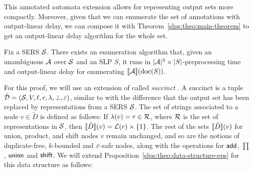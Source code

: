 This annotated automata extension allows for representing output sets more compactly. Moreover, given that we can enumerate the set of annotations with output-linear delay, we can compose it with Theorem~\ref{slps:theo:main-theorem} to get an output-linear delay algorithm for the whole set.  

\begin{theorem}\label{slps:theo-algo-succ}
	Fix a SERS $\mathcal{S}$. There exists an enumeration algorithm that, given an unambiguous \crt $\mathcal{A}$ over $\mathcal{S}$ and an SLP $S$, it runs in $|\mathcal{A}|^3 \times |S|$-preprocessing time and output-linear delay for enumerating $\llbracket \mathcal{A} \rrbracket(\operatorname{doc}(S))$. 
\end{theorem}
	For this proof, we will use an extension of \dsabbrs called {\it succinct \dsabbrs}.
	A succinct \dsabbrs is a tuple $\tilde{\mathcal{D}} = (\mathcal{S}, V, \ell, r, \lambda, \bot, \varepsilon)$, similar to \dsabbr with the difference that the output set has been replaced by representations from a SERS $\mathcal{S}$. The set of strings associated to a node $v\in \tilde{D}$ is defined as follows: 
	If $\lambda(v) = r\in \mathcal{R}$, where $\mathcal{R}$ is the set of representations in $\mathcal{S}$, then ${\llbracket{\tilde{D}}\rrbracket}(v) = \mathcal{L}(r)\times\{1\}$. The rest of the sets ${\llbracket{\tilde{D}}\rrbracket}(v)$ for union, product, and shift nodes $v$ remain unchanged, and so are the notions of duplicate-free, $k$-bounded and $\varepsilon$-safe nodes, along with the operations for $\mathsf{add}$, $\prod$, $\mathsf{union}$ and $\mathsf{shift}$. 
	We will extend Proposition~\ref{slps:theo:data-structure-eps} for this data structure as follows: 
	
